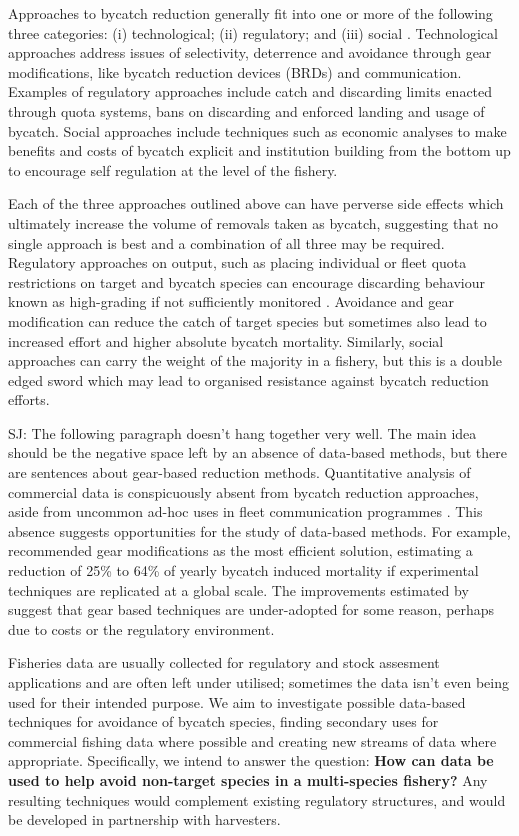 \documentclass{article}
\newcommand{\sj}[1]{{\color{red}\mbox{}\marginpar{\raggedleft\hspace{0pt}*} SJ: #1}}
\begin{document}
Approaches to bycatch reduction generally fit into one or more of the following three categories: (i) technological; (ii) regulatory; and (iii) social \citep{hall2005managing}. Technological approaches address issues of selectivity, deterrence and avoidance through gear modifications, like bycatch reduction devices (BRDs) and communication. Examples of regulatory approaches include catch and discarding limits enacted through quota systems, bans on discarding and enforced landing and usage of bycatch. Social approaches include techniques such as economic analyses to make benefits and costs of bycatch explicit and institution building from the bottom up to encourage self regulation at the level of the fishery.

Each of the three approaches outlined above can have perverse side effects which ultimately increase the volume of removals taken as bycatch, suggesting that no single approach is best and a combination of all three may be required. Regulatory approaches on output, such as placing individual or fleet quota restrictions on target and bycatch species can encourage discarding behaviour known as high-grading if not sufficiently monitored \citep{branch2006replacing,Abbott2009195}. Avoidance and gear modification can reduce the catch of target species but sometimes also lead to increased effort and higher absolute bycatch mortality. Similarly, social approaches can carry the weight of the majority in a fishery, but this is a double edged sword which may lead to organised resistance against bycatch reduction efforts.

\sj{The following paragraph doesn't hang together very well. The main idea should be the negative space left by an absence of data-based methods, but there are sentences about gear-based reduction methods.}
Quantitative analysis of commercial data is conspicuously absent from bycatch reduction approaches, aside from uncommon ad-hoc uses in fleet communication programmes \citep{gilman2006fleet}. This absence suggests opportunities for the study of data-based methods. For example, \citet{hall2005managing} recommended gear modifications as the most efficient solution, estimating a reduction of 25\% to 64\% of yearly bycatch induced mortality if experimental techniques are replicated at a global scale. The improvements estimated by \citet{hall2005managing} suggest that gear based techniques are under-adopted for some reason, perhaps due to costs or the regulatory environment.

Fisheries data are usually collected for regulatory and stock assesment applications and are often left under utilised; sometimes the data isn't even being used for their intended purpose. We aim to investigate possible data-based techniques for avoidance of bycatch species, finding secondary uses for commercial fishing data where possible and creating new streams of data where appropriate. Specifically, we intend to answer the question: \textbf{How can data be used to help avoid non-target species in a multi-species fishery?} Any resulting techniques would complement existing regulatory structures, and would be developed in partnership with harvesters. 
\end{document}
